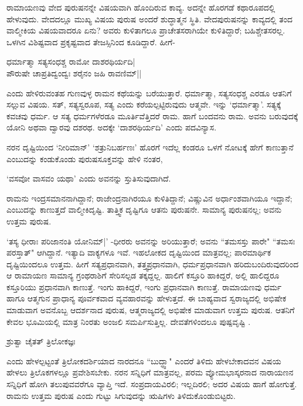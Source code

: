 ರಾಮಾಯಣವು ವೇದ ಪುರುಷನನ್ನೇ ವಿಷಯವಾಗಿ ಹೊಂದಿರುವ ಕಾವ್ಯ. ಅದನ್ನೇ ಹೊರಗಡೆ ಕಥಾರೂಪದಲ್ಲಿ ಹೇಳುವುದು. ವೇದದಲ್ಲೂ ಮುಖ್ಯ ವಿಷಯ ಪುರುಷ ಅಂದರೆ ಶುದ್ಧಾತ್ಮನ ಸ್ಥಿತಿ. ವೇದಪುರುಷನನ್ನು ಕಾವ್ಯದಲ್ಲಿ ತಂದ ವಾಲ್ಮೀಕಿಯ ವಿಷಯವಾದರೂ ಏನು? ಅವರು ಕುಳಿತಾಗಲೂ ಪ್ರಾಚೇತಸರಾಗಿಯೇ ಕುಳಿತಿದ್ದಾರೆ; ಬಹಿಶ್ಚೇತಸರಲ್ಲ. ಒಳಗಿನ ವಿಶಿಷ್ಟವಾದ ಪ್ರಕೃಷ್ಟವಾದ ತೇಜಸ್ಸಿನಿಂದ ಕೂಡಿದ್ದಾರೆ. ಹೀಗೆ-

\begin{shloka}
ಧರ್ಮಾತ್ಮಾ ಸತ್ಯಸಂಧಶ್ಚ ರಾಮೋ ದಾಶರಥಿರ್ಯದಿ|\label{250a}\\
ಪೌರುಷೇ ಚಾಪ್ರತಿದ್ವಂದ್ವಃ ಶರೈನಂ ಜಹಿ ರಾವಣಿಮ್||
\end{shloka}

ಎಂದು ಹೇಳಿರುವಂತಹ ಗುಣವುಳ್ಳ ರಾಮನ ಕಥೆಯನ್ನು ಬರೆಯುತ್ತಾರೆ. ಧರ್ಮಾತ್ಮಾ, ಸತ್ಯಸಂಧಶ್ಚ ಎರಡೂ ಆತನಿಗೆ ಸಲ್ಲುವ ವಿಷಯ. ಸತ್, ಸತ್ಯಸ್ವರೂಪ, ಸತ್ಯ ಎಂದು ಕರೆಯಲ್ಪಟ್ಟಿರುವುದು ಆತ್ಮವೇ. ಇನ್ನು `ಧರ್ಮಾತ್ಮಾ'. ಸತ್ಯಕ್ಕೆ ಕವಚವು ಧರ್ಮ.  ಆ ಸತ್ಯ ಧರ್ಮಗಳೆರಡೂ ಮೂರ್ತಿವೆತ್ತಿದರೆ ರಾಮ. ಹಾಗೆ ಬಂದವನು ರಾಮ. ಅವನು ಬರುವುದಕ್ಕೆ ಯೋನಿ ಅಥವಾ ದ್ವಾರವು ದಶರಥ. ಅದಕ್ಕೇ `ದಾಶರಥಿರ್ಯದಿ' ಎಂದು ಪದವಿನ್ಯಾಸ. 

ನರನ ದೃಷ್ಟಿಯಿಂದ `ನೀರಿಮಾನ್' `ಶತ್ರುನಿಬರ್ಹಣಃ'\label{250e} ಹೊರಗೆ ಇದೆಲ್ಲ ಕಂಡರೂ ಒಳಗೆ ನೋಟಕ್ಕೆ ಹೇಗೆ ಕಾಣುತ್ತಾನೆ ಎಂಬುದನ್ನು ಕಂಡುಕೊಂಡು ಪುರುಷಸೂಕ್ತವನ್ನು ಹೇಳಿ ನಂತರ, 

\begin{shloka}
`ವಸವೋ ವಾಸವಂ ಯಥಾ'\label{250e} ಎಂದು ಅವನನ್ನು ಸ್ತುತಿಸುವುದಾಗಿದೆ.
\end{shloka}

ರಾಮನು ಇಂದ್ರಸಮಾನನಾಗಿದ್ದಾನೆ; ರಾಜೇಂದ್ರನಾಗಿರಯೂ ಕುಳಿತಿದ್ದಾನೆ; ವಿಷ್ಣುವಿನ ಅರ್ಧಾಂಶವಾಗಿಯೂ ಇದ್ದಾನೆ; ಎಂಬುದನ್ನು ಕಾಣುತ್ತದೆ ವಾಲ್ಮೀಕಿದೃಷ್ಟಿ. ತಾತ್ತ್ವಿಕ ದೃಷ್ಟಿಗೂ ಆತನು ಪುರುಷನೇ. ಸಾಮಾನ್ಯ ಪುರುಷನಲ್ಲ; ಅವನು ಉತ್ತಮ ಪುರುಷ. 

`ತಸ್ಯ ಧೀರಾಃ ಪರಿಜಾನಂತಿ ಯೋನಿಮ್|' -ಧೀರರು ಅವನನ್ನು ಅರಿಯುತ್ತಾರೆ; ಅವನು ``ತಮಸಸ್ತು ಪಾರೇ" ``ತಮಸಃ ಪರಸ್ತಾತ್"\label{251} ಆಗಿದ್ದಾನೆ. ಇತ್ಯಾದಿ ವಾಕ್ಯಗಳೂ ಇವೆ. ಇಹಲೋಕದ ದೃಷ್ಟಿಯಿಂದ ಮಾತ್ರವಲ್ಲ; ಪಾರಮಾರ್ಥಿಕ ದೃಷ್ಟಿಯಿಂದಲೂ ಉತ್ತಮ. ಹೀಗೆ ಸತ್ಯಪ್ರಧಾನವಾಗಿ, ತತ್ತ್ವಪ್ರಧಾನವಾಗಿ, ಧರ್ಮಪ್ರಧಾನವಾಗಿ ಹರಿದುಬಂದಿರುವುದರಿಂದ ಆ ರಾಮಾಯಣ ಸಾಮಾನ್ಯ ಗ್ರಂಥರಾಶಿಗೆ ಸೇರಿಸಲ್ಪಡ ತಕ್ಕದ್ದಲ್ಲ. ಹಾಲಿಗೆ ಕಸ್ತೂರಿ ಹಾಕಿದ್ದರೆ, ಅಲ್ಲಿ ಹಾಲಿದ್ದರೂ ಕಸ್ತೂರಿಯು ಪ್ರಧಾನವಾಗಿ ಕಾಣುತ್ತೆ. ಇಂಗು ಹಾಕಿದ್ದರೆ, ಇಂಗು ಪ್ರಧಾನವಾಗಿ ಕಾಣುತ್ತೆ. ರಾಮಾಯಣವು ಧರ್ಮ ಹಾಗೂ ಆತ್ಮಗುನ ಪ್ರಾಧಾನ್ಯ ಪೂರ್ವಕವಾದ ವ್ಯವಹಾರವನ್ನು ಹೇಳುತ್ತದೆ. ಈ ಬಾಹ್ಯವಾದ ಸ್ವರಾಜ್ಯದಲ್ಲಿ ಅಭಿಷೇಕ ಮಾಡುವಾಗ ಅವನೊಬ್ಬ ಆದರ್ಶನಾದ ಪುರುಷ, ಆತ್ಮರಾಜ್ಯದಲ್ಲಿ ಅಭಿಷೇಕ ಮಾಡುವಾಗ ಉತ್ತಮ ಪುರುಷ. ಆತನಿಗೆ ಕೇವಲ ಭೂಮಿಯಲ್ಲಿ ಮಾತ್ರ ನಿಂರತು ಅಂಜಲಿ ಸಮರ್ಪಿಸುತ್ತಿಲ್ಲ. ದೇವತೆಗಳಿಂದಲೂ ಪುಷ್ಪವೃಷ್ಟಿ .

\begin{shloka}
ಶ್ರುತ್ವಾ ಚೈತತ್ ತ್ರಿಲೋಕಜ್ಞಃ
\end{shloka}
ಎಂದು ಹೇಳಲ್ಪಟ್ಟಂತೆ ತ್ರಿಲೋಕದರ್ಶಿಯಾದ ನಾರದನೂ ``ಬುದ್ಧ್ವಾ" ಎಂದರೆ ತಿಳಿದು ಹೇಳಬೇಕಾದವನ ವಿಷಯ ಹೇಳಲು ತ್ರಿಲೊಕಗಳಲ್ಲೂ ಪ್ರವೇಶಿಸಬೇಕು. ನರನ ಸನ್ನಿಧಿಗೆ ಮಾತ್ರವಲ್ಲ, ಪರಮ ವ್ಯೋಮಭಾಸ್ಕರನಾದ ನಾರಾಯಣನ ಸನ್ನಿಧಿಗೆ ಹೋಗಿ ತಲುಪುವವರೆಗೂ ವ್ಯಾಪ್ತಿ ಇದೆ. ಸಂಪ್ರದಾಯವಿರಲಿ; ಇಲ್ಲದಿರಲಿ; ಅದರ ವಿಷಯ ಹಾಗೆ ಹೋಗುತ್ತೆ. ರಾಮನು ಉತ್ತಮ ಪುರುಷ ಎಂದು ಗುಟ್ಟು ಸಿಗುವುದನ್ನು ಋಷಿಗಳು ತಿಳಿದುಕೊಂಡುಬಿಟ್ಟರು.

